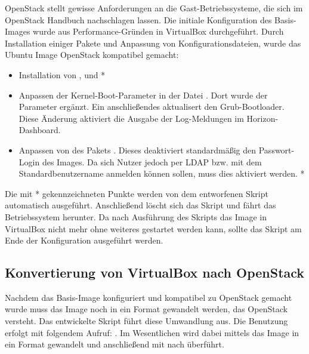 OpenStack stellt gewisse Anforderungen an die Gast-Betriebssysteme, die sich im OpenStack Handbuch \cite{osImageRequirement} nachschlagen lassen. 
Die initiale Konfiguration des Basis-Images wurde aus Performance-Gründen in VirtualBox durchgeführt.
Durch Installation einiger Pakete und Anpassung von Konfigurationsdateien, wurde das Ubuntu Image OpenStack kompatibel gemacht:

\begin{itemize}
\item Installation von ,  und  *
\item Anpassen der Kernel-Boot-Parameter in der Datei . Dort wurde der Parameter  ergänzt. Ein anschließendes  aktualisert den Grub-Bootloader. Diese Änderung aktiviert die Ausgabe der Log-Meldungen im Horizon-Dashboard.
\item Anpassen von  des Pakets . Dieses deaktiviert standardmäßig den Passwort-Login des Images. Da sich Nutzer jedoch per LDAP bzw. mit dem Standardbenutzername anmelden können sollen, muss dies aktiviert werden. *
\end{itemize}

Die mit * gekennzeichneten Punkte werden von dem entworfenen Skript  automatisch ausgeführt. 
Anschließend löscht sich das Skript und fährt das Betriebssystem herunter.
Da nach Ausführung des  Skripts das Image in VirtualBox nicht mehr ohne weiteres gestartet werden kann, sollte das Skript am Ende der Konfiguration ausgeführt werden.

\subsection{Konvertierung von VirtualBox nach OpenStack}

Nachdem das Basis-Image konfiguriert und kompatibel zu OpenStack gemacht wurde muss das Image noch in ein Format gewandelt werden, das OpenStack versteht.
Das entwickelte Skript  führt diese Umwandlung aus. 
Die Benutzung erfolgt mit folgendem Aufruf: .
Im Wesentlichen wird dabei mittels  das Image in ein  Format gewandelt und anschließend mit  nach  überführt.

